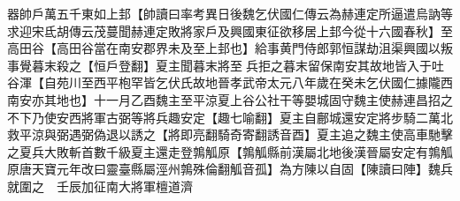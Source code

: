 器帥戶萬五千東如上邽【帥讀曰率考異日後魏乞伏國仁傳云為赫連定所逼遣烏訥等求迎宋氐胡傳云茂蔓聞赫連定敗將家戶及興國東征欲移居上邽今從十六國春秋】至高田谷【高田谷當在南安郡界未及至上邽也】給事黄門侍郎郭恒謀劫沮渠興國以叛事覺暮末殺之【恒戶登翻】夏主聞暮末將至兵拒之暮末留保南安其故地皆入于吐谷渾【自苑川至西平枹罕皆乞伏氏故地晉孝武帝太元八年歲在癸未乞伏國仁據隴西南安亦其地也】十一月乙酉魏主至平涼夏上谷公社干等嬰城固守魏主使赫連昌招之不下乃使安西將軍古弼等將兵趣安定【趣七喻翻】夏主自鄜城還安定將步騎二萬北救平涼與弼遇弼偽退以誘之【將即亮翻騎奇寄翻誘音酉】夏主追之魏主使高車馳擊之夏兵大敗斬首數千級夏主還走登鶉觚原【鶉觚縣前漢屬北地後漢晉屬安定有鶉觚原唐天寶元年改曰靈臺縣屬涇州鶉殊倫翻觚音孤】為方陳以自固【陳讀曰陣】魏兵就圍之　壬辰加征南大將軍檀道濟